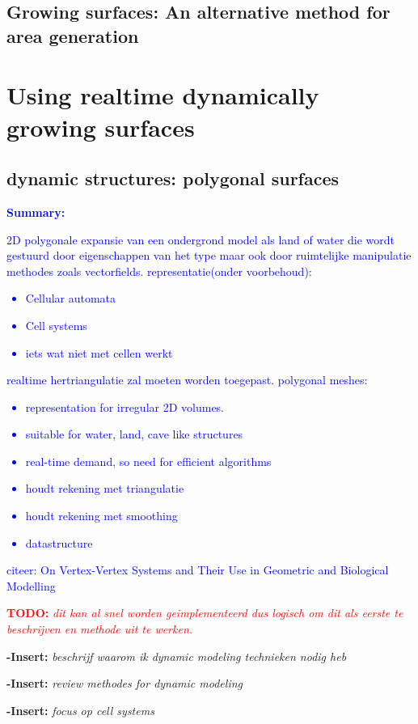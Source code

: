 \documentclass{article}
\newcommand{\todo}[1]{\textcolor{red}{\textbf{\newline TODO: }\it{#1} \newline}}
\newcommand{\inhoud}[1]{\textcolor{blue}{\textbf{\newline Summary: }\it{#1}}}
\newcommand{\voegtoe}[1]{\textcolor{MyDarkGreen}{\textbf{-Insert: }\it{#1}}}
\begin{document}
\subsection{Growing surfaces: An alternative method for area generation}


 

\section{Using realtime dynamically growing surfaces}

\subsection{dynamic structures: polygonal surfaces}
\inhoud{2D polygonale expansie van een ondergrond model als land of water die wordt gestuurd door eigenschappen van het type maar ook door ruimtelijke manipulatie methodes zoals vectorfields. representatie(onder voorbehoud): 
\begin{itemize}
\item Cellular automata
\item Cell systems
\item iets wat niet met cellen werkt  
\end{itemize}
realtime hertriangulatie zal moeten worden toegepast. 
polygonal meshes: 
\begin{itemize}
\item representation for irregular 2D volumes.  
\item suitable for water, land, cave like structures  
\item real-time demand, so need for efficient algorithms
\item houdt rekening met triangulatie
\item houdt rekening met smoothing
\item datastructure
\end{itemize}
citeer: On Vertex-Vertex Systems and Their Use in
Geometric and Biological Modelling
}

\todo{dit kan al snel worden geimplementeerd dus logisch om dit als eerste te beschrijven en methode uit te werken.}

\voegtoe{beschrijf waarom ik dynamic modeling technieken nodig heb}



\voegtoe{review methodes for dynamic modeling}


\voegtoe{focus op cell systems}
\end{document}
